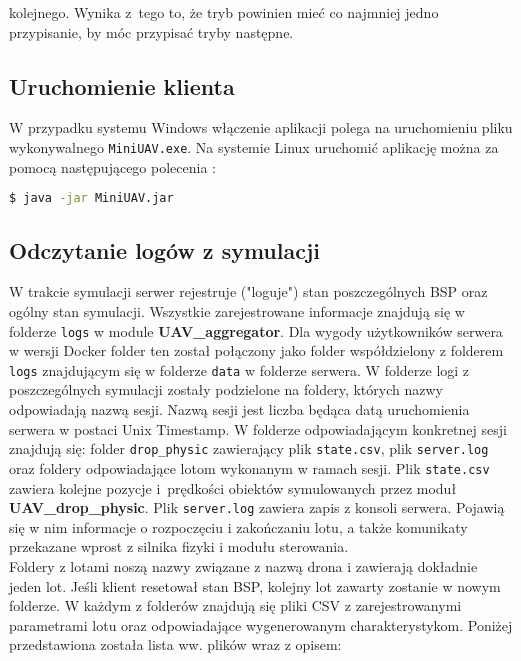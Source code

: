 kolejnego. Wynika z~tego to, że tryb powinien mieć co najmniej jedno przypisanie, by móc przypisać tryby następne.

\subsection{Uruchomienie klienta}

W przypadku systemu Windows włączenie aplikacji polega na uruchomieniu pliku wykonywalnego \texttt{MiniUAV.exe}. Na systemie Linux uruchomić aplikację można za pomocą następującego polecenia :

\begin{lstlisting}[language=bash]
	$ java -jar MiniUAV.jar
\end{lstlisting}

\subsection{Odczytanie logów z symulacji}

W trakcie symulacji serwer rejestruje ("loguje") stan poszczególnych BSP oraz ogólny stan symulacji. Wszystkie zarejestrowane informacje znajdują się w folderze \texttt{logs} w module \textbf{UAV\_aggregator}. Dla wygody użytkowników serwera w wersji Docker folder ten został połączony jako folder współdzielony z folderem \texttt{logs} znajdującym się w folderze \texttt{data} w folderze serwera. W folderze logi z poszczególnych symulacji zostały podzielone na foldery, których nazwy odpowiadają nazwą sesji. Nazwą sesji jest liczba będąca datą uruchomienia serwera w postaci Unix Timestamp. W folderze odpowiadającym konkretnej sesji znajdują się: folder \texttt{drop\_physic} zawierający plik \texttt{state.csv}, plik \texttt{server.log} oraz foldery odpowiadające lotom wykonanym w ramach sesji. Plik \texttt{state.csv} zawiera kolejne pozycje i~prędkości obiektów symulowanych przez moduł \textbf{UAV\_drop\_physic}. Plik \texttt{server.log} zawiera zapis z konsoli serwera. Pojawią się w nim informacje o rozpoczęciu i zakończaniu lotu, a także komunikaty przekazane wprost z silnika fizyki i modułu sterowania.\\

Foldery z lotami noszą nazwy związane z nazwą drona i zawierają dokładnie jeden lot. Jeśli klient resetował stan BSP, kolejny lot zawarty zostanie w nowym folderze. W każdym z folderów znajdują się pliki CSV z zarejestrowanymi parametrami lotu oraz odpowiadające wygenerowanym charakterystykom. Poniżej przedstawiona została lista ww. plików wraz z opisem:

